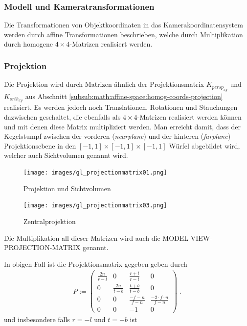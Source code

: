 \subsubsection*{Modell und Kameratransformationen}
Die Transformationen von Objektkoordinaten in das Kamerakoordinatensystem werden durch affine Transformationen beschrieben, welche durch Multiplikation durch homogene $4 \times 4$-Matrizen realisiert werden. 

\subsubsection*{Projektion}
Die Projektion wird durch Matrizen ähnlich der Projektionsmatrix 
$K_{persp_{xy}}$ und $K_{orth_{xy}}$ aus Abschnitt 
\ref{subsub:math:affine-space:homog-coords-projection} realisiert. 
Es werden jedoch noch  Translationen, Rotationen und Stauchungen 
dazwischen geschaltet, die ebenfalls als $4 \times 4$-Matrizen realisiert werden 
können und mit denen diese Matrix multipliziert werden. 
Man erreicht damit, dass der Kegelstumpf zwischen der vorderen 
(\textit{nearplane}) und der hinteren (\textit{farplane}) Projektionsebene in 
den $[-1,1] \times [-1,1] \times [-1,1] $ Würfel abgebildet wird, welcher auch 
Sichtvolumen genannt wird. 

\begin{figure}[H]
    \centering
    \texttt{[image: images/gl\_projectionmatrix01.png]}
    \caption{Projektion und Sichtvolumen}
    \label{fig:projection-sight-vol}
\end{figure}

\begin{figure}[H]
    \centering
    \texttt{[image: images/gl\_projectionmatrix03.png]}
    \caption{Zentralprojektion}
    \label{fig:projection-sight-vol}
\end{figure}
Die Multiplikation all dieser Matrizen wird auch die MODEL-VIEW-PROJECTION-MATRIX genannt. 

In obigen Fall ist die Projektionsmatrix gegeben  geben durch 
\begin{align*}
P := \begin{pmatrix}  
\frac{2n}{r-l}  &  0 &  \frac{r+l}{r-l}  & 0  \\
0   &  \frac{2n}{t-b} & \frac{t+b}{t-b} & 0  \\
0   &  0 & \frac{-f-n}{f-n} & \frac{-2\cdot f \cdot n}{f-n}  \\
0   &  0 & -1 & 0  
\end{pmatrix}  \; .
\end{align*} 
und insbesondere falls $r = -l$ und $t=-b$  ist

